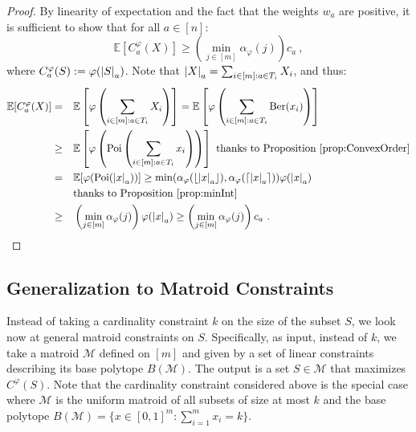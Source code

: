 \begin{proof}
  By linearity of expectation and the fact that the weights $w_a$ are positive, it is sufficient to show that for all $a \in [n]$:
  \[ \mathbb{E}[C_a^{\varphi}(X)] \geq \left(\min_{j \in [m]} \alpha_{\varphi}(j) \right) c_a \ , \]
 where $C_a^{\varphi}(S) := \varphi(\abs{S}_a)$. Note that $\abs{X}_a = \sum_{i \in [m] : a \in T_i} X_i$, and thus:
  \begin{equation}
    \begin{aligned}
      \mathbb{E}[C_a^{\varphi}(X)] &=&& \mathbb{E}\left[\varphi\left(\sum_{i \in [m] : a \in T_i} X_i\right)\right] = \mathbb{E}\left[\varphi\left(\sum_{i \in [m] : a \in T_i}\operatorname{\text{Ber}}(x_i) \right)\right]\\
      &\geq&& \mathbb{E}\left[\varphi\left(\operatorname{\text{Poi}}\left(\sum_{i \in [m] : a \in T_i} x_i\right)\right)\right] \text{ thanks to Proposition~\ref{prop:ConvexOrder}}\\
      &=&& \mathbb{E}[\varphi(\operatorname{\text{Poi}}(\abs{x}_a))] \geq \min(\alpha_{\varphi}(\lfloor \abs{x}_a \rfloor), \alpha_{\varphi}(\lceil \abs{x}_a \rceil)) \varphi(\abs{x}_a)\\
      &\quad&& \text{thanks to Proposition~\ref{prop:minInt}}\\
      &\geq&& \left(\min_{j \in [m]} \alpha_{\varphi}(j) \right) \varphi(\abs{x}_a) \geq \left(\min_{j \in [m]} \alpha_{\varphi}(j) \right) c_a\ .
    \end{aligned}
  \end{equation}

\end{proof}

\subsection{Generalization to Matroid Constraints}
\label{sec:matroid}

Instead of taking a cardinality constraint $k$ on the size of the subset $S$, we look now at general matroid constraints on $S$. Specifically, as input, instead of $k$, we take a matroid $\mathcal{M}$ defined on $[m]$ and given by a set of linear constraints describing its base polytope $B(\mathcal{M})$. The output is a set $S \in \mathcal{M}$ that maximizes $C^{\varphi}(S)$. Note that the cardinality constraint considered above is the special case where $\mathcal{M}$ is the uniform matroid of all subsets of size at most $k$ and the base polytope $B(\mathcal{M}) = \{ x \in [0,1]^m : \sum_{i=1}^m x_i = k\}$.

